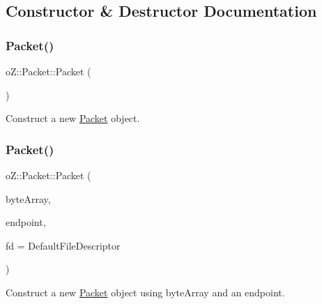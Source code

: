 \subsection{Constructor \& Destructor Documentation}
\mbox{\label{classo_z_1_1_packet_a5c96f8d5db686e035b199e8aeb0e0cea}} 
\subsubsection{\texorpdfstring{Packet()}{Packet()}\hspace{0.1cm}{\footnotesize\ttfamily [1/2]}}
{\footnotesize\ttfamily o\+Z\+::\+Packet\+::\+Packet (\begin{DoxyParamCaption}\item[{void}]{ }\end{DoxyParamCaption})\hspace{0.3cm}{\ttfamily [default]}}



Construct a new \mbox{\hyperlink{classo_z_1_1_packet}{Packet}} object. 

\mbox{\label{classo_z_1_1_packet_af319d110c50b2f639e97b521ab28dc05}} 
\subsubsection{\texorpdfstring{Packet()}{Packet()}\hspace{0.1cm}{\footnotesize\ttfamily [2/2]}}
{\footnotesize\ttfamily o\+Z\+::\+Packet\+::\+Packet (\begin{DoxyParamCaption}\item[{\mbox{\hyperlink{namespaceo_z_abfa3f5a46e5c7584615dc1dd33fcafb6}{Byte\+Array}} \&\&}]{byte\+Array,  }\item[{const \mbox{\hyperlink{classo_z_1_1_endpoint}{Endpoint}}}]{endpoint,  }\item[{const File\+Descriptor}]{fd = {\ttfamily DefaultFileDescriptor} }\end{DoxyParamCaption})\hspace{0.3cm}{\ttfamily [inline]}}



Construct a new \mbox{\hyperlink{classo_z_1_1_packet}{Packet}} object using byte\+Array and an endpoint. 

